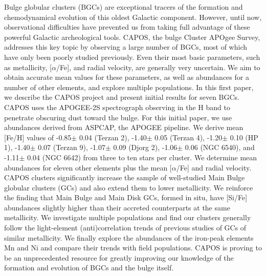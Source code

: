 \documentclass[onecolumn]{aa}
\begin{document}
  \abstract
   {Bulge globular clusters (BGCs)
are exceptional tracers of the formation and chemodynamical evolution of this oldest Galactic component.
However, until now, observational difficulties have prevented us from taking full advantage of these powerful Galactic archeological tools.
}
   {CAPOS, the bulge Cluster APOgee Survey, addresses this key topic by observing a large number of BGCs, most of which have only been poorly studied previously. Even their most basic parameters, such as metallicity, [$\alpha$/Fe], and radial velocity, are generally very uncertain. We aim to obtain accurate mean values for these parameters, as well as abundances for a number of other elements, 
and explore multiple populations. In this first paper, we describe the CAPOS project and present initial results for seven BGCs.}
   {CAPOS uses  the  APOGEE-2S   spectrograph observing in the H band to penetrate obscuring dust toward the bulge. For this initial paper, we use abundances derived from ASPCAP,
   the APOGEE pipeline.}
   {We derive mean [Fe/H] values of 
-0.85$\pm${ 0.04} (Terzan 2), 
-1.40$\pm${ 0.05} (Terzan 4), 
-1.20$\pm${ 0.10} (HP 1), 
-1.40$\pm${ 0.07} (Terzan 9), 
-1.07$\pm${ 0.09} (Djorg 2), 
-1.06$\pm${ 0.06} (NGC 6540), and 
-1.11$\pm${ 0.04} (NGC 6642) from three to ten stars per cluster. 
We determine mean abundances for eleven other elements plus the mean [$\alpha$/Fe]
and radial velocity.  CAPOS clusters significantly increase the sample of well-studied Main Bulge globular clusters (GCs) and also extend them to lower metallicity.
We reinforce the finding 
that Main Bulge and Main Disk GCs, formed in situ, have [Si/Fe] abundances slightly higher than their accreted counterparts at the same metallicity.  We investigate multiple populations and find our clusters
generally follow the light-element (anti)correlation trends of previous studies of GCs of similar metallicity. %
We finally explore the abundances of the %
iron-peak elements Mn and Ni and compare their
trends with 
field  populations. 
}
   {CAPOS is proving to be 
   an unprecedented resource for greatly improving our knowledge of the formation and evolution of BGCs and the bulge itself.}
\end{document}
